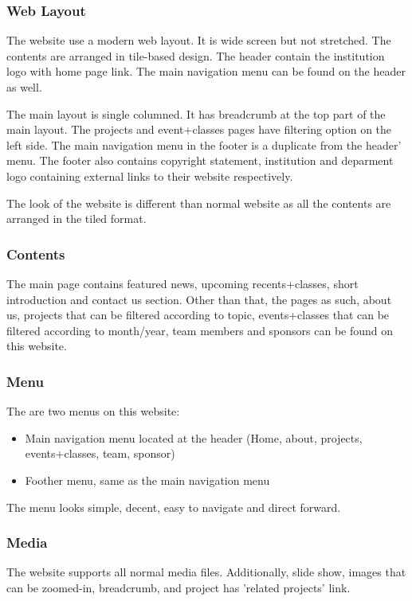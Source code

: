 \subsubsection*{Web Layout}
The website use a modern web layout. It is wide screen but not stretched. The contents are arranged in tile-based design. The header contain the institution logo with home page link. The main navigation menu can be found on the header as well.

The main layout is single columned. It has breadcrumb at the top part of the main layout. The projects and event+classes pages have filtering option on the left side. The main navigation menu in the footer is a duplicate from the header' menu. The footer also contains copyright statement, institution and deparment logo containing external links to their website respectively.

The look of the website is different than normal website as all the contents are arranged in the tiled format.

\subsubsection*{Contents}
The main page contains featured news, upcoming recents+classes, short introduction and contact us section. Other than that, the pages as such, about us, projects that can be filtered according to topic, events+classes that can be filtered according to month/year, team members and sponsors can be found on this website.

\subsubsection*{Menu}
The are two menus on this website:
\begin{itemize}
\item Main navigation menu located at the header (Home, about, projects, events+classes, team, sponsor)
\item Foother menu, same as the main navigation menu
\end{itemize}

The menu looks simple, decent, easy to navigate and direct forward.

\subsubsection*{Media}
The website supports all normal media files. Additionally, slide show, images that can be zoomed-in, breadcrumb, and project has 'related projects' link.

